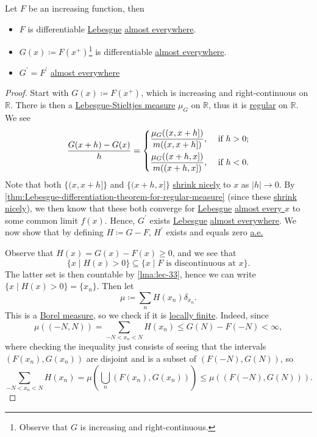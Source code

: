 \begin{theorem}\label{thm:monotone-differentiation}
	Let \(F\) be an increasing function, then
	\begin{itemize}
		\item \(F\) is differentiable \hyperref[def:Lebesgue-measure]{Lebesgue} \hyperref[def:mu-almost-everywhere]{almost everywhere}.
		\item \(G(x) \coloneqq F(x^+)\)\footnote{Observe that \(G\) is increasing and right-continuous.} is differentiable \hyperref[def:mu-almost-everywhere]{almost everywhere}.
		\item \(G^\prime  = F^\prime \) \hyperref[def:mu-almost-everywhere]{almost everywhere}
	\end{itemize}
\end{theorem}
\begin{proof}
	Start with \(G(x)\coloneqq F(x^+)\), which is increasing and right-continuous on \(\mathbb{R}\). There is then a
	\hyperref[def:Lebesgue-Stieltjes-measure]{Lebesgue-Stieltjes measure}
	\(\mu_G\) on \(\mathbb{R}\), thus it is \hyperref[def:regular]{regular} on \(\mathbb{R}\). We see
	\[
		\frac{G(x+h) - G(x)}{h} = \begin{dcases}
			\frac{\mu _{G} ((x, x+h])}{m((x, x+h])}, & \text{ if } h>0 ; \\
			\frac{\mu _{G} ((x+h, x])}{m((x+h, x])}, & \text{ if } h<0 .
		\end{dcases}
	\]
	Note that both \(\{(x, x+h]\}\) and \(\{(x+h, x]\}\) \hyperref[def:shrink-nicely]{shrink nicely} to \(x\) as \(\left\vert h \right\vert \to 0\).
	By \autoref{thm:Lebesgue-differentiation-theorem-for-regular-measure} (since these \hyperref[def:shrink-nicely]{shrink nicely}), we
	then know that these both converge for \hyperref[def:Lebesgue-measure]{Lebesgue} \hyperref[def:mu-almost-everywhere]{almost every \(x\)} to some common limit \(f(x)\).
	Hence, \(G^\prime\) exists \hyperref[def:Lebesgue-measure]{Lebesgue} \hyperref[def:mu-almost-everywhere]{almost everywhere}. We now show that by defining \(H \coloneqq G - F\),
	\(H^\prime \) exists and equals zero \hyperref[def:mu-almost-everywhere]{a.e.}

	Observe that \(H(x) = G(x) - F(x) \geq 0\), and we see that
	\[
		\{x \mid H(x) > 0\} \subseteq \{x \mid F \text{ is discontinuous at } x\}.
	\]
	The latter set is then countable by \autoref{lma:lec-33}, hence we can write \(\{x \mid H(x) > 0\} = \{x_n\}\). Then let
	\[
		\mu \coloneqq \sum_n H(x_n) \delta_{x_n}.
	\]
	This is a \hyperref[def:Borel-measure]{Borel measure}, so we check if it is \hyperref[def:locally-finite]{locally finite}. Indeed, since
	\[
		\mu((-N,N)) = \sum_{-N < x_n < N} H(x_n) \leq G(N) - F(-N) < \infty,
	\]
	where checking the inequality just consists of seeing that the intervals \((F(x_n), G(x_n))\) are disjoint and is a subset of \((F(-N),G(N))\), so
	\[
		\sum_{-N < x_n < N} H(x_n) = \mu\left( \bigcup_n (F(x_n), G(x_n)) \right) \leq \mu((F(-N),G(N))).
	\]


\end{proof}
